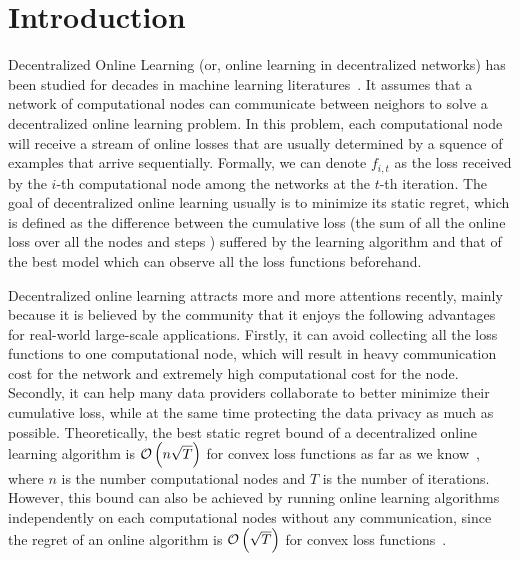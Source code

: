 \documentclass{article}
\begin{document}
\section{Introduction}
\label{sect_introduction}
Decentralized Online Learning (or, online learning in decentralized networks) has been studied for decades in machine learning literatures~\citep{8015179Shahram,Kamp:2014:CDO,Koppel-8352032,Zhang2018,pmlr-v70-zhang17g,Xu2015,tcns-7353155,cdc-7798923,acc-7172037,tcns-7479495,Benczur:2018ww,tkde-6311406}. 
It assumes that a network of computational nodes can communicate between neighors to solve a decentralized online learning problem.
In this problem, each computational node will receive a stream of online losses that are usually determined by a squence of examples that arrive sequentially. 
Formally, we can denote $f_{i,t}$  as the loss received by the $i$-th computational node among the networks at the $t$-th iteration. 
The goal of decentralized online learning usually is to minimize its static regret, which is defined as the difference between the cumulative loss (the sum of all the online loss over all the nodes and steps ) suffered by the learning algorithm and that of the best model which can observe all the loss functions beforehand. 

Decentralized online learning attracts more and more attentions recently, mainly because it is believed by the community that it enjoys the following advantages for real-world large-scale applications.
Firstly, it can avoid collecting all the loss functions to one computational node, which will result in heavy communication cost for the network and extremely high computational cost for the node.
Secondly, it can help many data providers collaborate to better minimize their cumulative loss, while at the same time protecting the data privacy as much as possible. 
Theoretically, the best static regret bound of a decentralized online learning algorithm is ${\mathcal{O}\left( n\sqrt{T} \right)}$ for convex loss functions as far as we know~\citep{6760092,tkde-6311406}, where $n$ is the number computational nodes and $T$ is the number of iterations.
However, this bound can also be achieved by running online learning algorithms independently on each computational nodes without any communication, since the regret of an online algorithm is ${\mathcal{O}\left( \sqrt{T} \right)}$ for convex loss functions~\citep{Hazan2016Introduction,ShalevShwartz:2012dz}.
\end{document}
